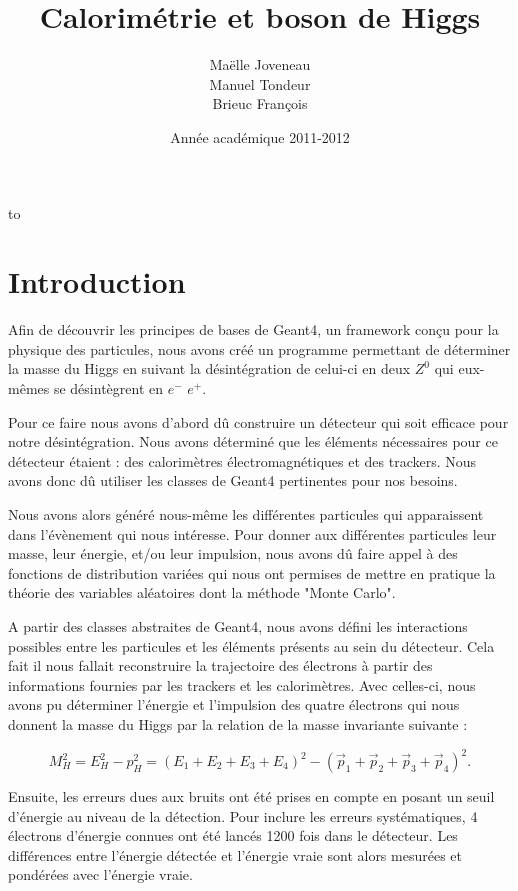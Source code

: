 \documentclass[11pt]{article}
\title{Calorimétrie et boson de Higgs}
\author{ Maëlle Joveneau \\ Manuel Tondeur \\ Brieuc François }
\date{Année académique 2011-2012}
\makeatletter
\def\clap#1{\hbox to 0pt{\hss #1\hss}}%
\def\haut#1#2#3{%
\hbox to \hsize{%
\rlap{\vtop{\raggedright #1}}%
\hss
\clap{\vtop{\centering #2}}%
\hss
\llap{\vtop{\raggedleft #3}}}}%
\def\bas#1#2#3{%
\hbox to \hsize{%
\rlap{\vbox{\raggedright #1}}%
\hss
\clap{\vbox{\centering #2}}%
\hss
\llap{\vbox{\raggedleft #3}}}}%
\def\maketitle{%
\thispagestyle{empty}\vbox to \vsize{%
\haut{}{\@blurb}{}
\vfill
\vspace{1cm}
\begin{flushleft}
\usefont{OT1}{ptm}{m}{n}
\huge \@title
\end{flushleft}
\par
\hrule height 4pt
\par
\begin{flushright}
\usefont{OT1}{phv}{m}{n}
\Large \@author
\par
\end{flushright}
\vspace{1cm}
\vfill
\vfill
\bas{}{\@location, \@date}{}
}%
\cleardoublepage
}
\makeatother
\begin{document}
	\maketitle
		
	\tableofcontents

	\newpage
	
			\section{Introduction}
	Afin de d\'ecouvrir les principes de bases de Geant4, un framework conçu
pour la physique des particules, nous avons cr\'eé un programme permettant de
d\'eterminer la masse du Higgs en suivant la d\'esint\'egration de celui-ci en
deux $Z^0$ qui eux-m\^emes se d\'esint\`egrent en $e^-$ $e^+$.

Pour ce faire nous avons d'abord dû construire un d\'etecteur qui soit efficace
pour notre d\'esint\'egration. Nous avons d\'etermin\'e que les \'el\'ements
n\'ecessaires pour ce d\'etecteur \'etaient : des calorim\`etres
\'electromagn\'etiques et des trackers. Nous avons donc dû utiliser les classes
de Geant4 pertinentes pour nos besoins.
 
Nous avons alors g\'en\'er\'e nous-m\^eme les diff\'erentes particules qui
apparaissent dans l'\'ev\`enement qui nous int\'eresse. Pour donner aux
diff\'erentes particules leur masse, leur \'energie, et/ou leur impulsion, nous
avons dû faire appel \`a des fonctions de distribution vari\'ees qui nous ont
permises de mettre en pratique la th\'eorie des variables aléatoires dont la
méthode "Monte Carlo".
 
A partir des classes abstraites de Geant4, nous avons défini les interactions
possibles entre les particules et les \'el\'ements pr\'esents au sein du
d\'etecteur. Cela fait il nous fallait reconstruire la trajectoire des
\'electrons \`a partir des informations fournies par les trackers et les
calorim\`etres. Avec celles-ci, nous avons pu d\'eterminer l'\'energie et
l'impulsion des quatre \'electrons qui nous donnent la masse du Higgs par la
relation de la masse invariante suivante : 
 
\begin{equation}
M_H^2=E_H^2-p_H^2=(E_1+E_2+E_3+E_4)^2-(\vec{p}_1+\vec{p}_2+\vec{p}_3+\vec{p}_4)^2.
\end{equation} 
    
Ensuite, les erreurs dues aux bruits ont \'et\'e prises en compte en posant un seuil d'\'energie au niveau de la 
d\'etection. Pour inclure les erreurs syst\'ematiques, 4 électrons d'énergie connues ont été lancés 1200 fois dans 
le détecteur. Les diff\'erences entre l'énergie détectée et l'énergie vraie sont alors mesurées et pondérées avec 
l'énergie vraie. 
\end{document}
